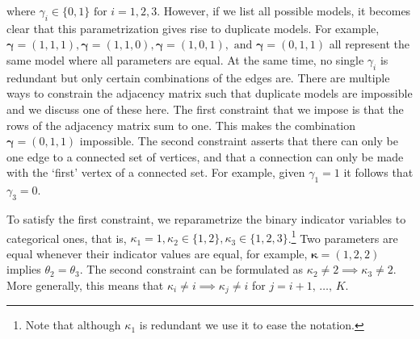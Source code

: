 \documentclass[]{article}
\newcommand{\bindicator}{\gamma}%
\newcommand{\cindicator}{\kappa}%
\begin{document}
where $\bindicator_i \in \{0, 1\} \text{ for } i=1, 2, 3$.
However, if we list all possible models, it becomes clear that this parametrization gives rise to duplicate models.
For example, $\bm{\bindicator} = (1, 1, 1), \bm{\bindicator} = (1, 1, 0), \bm{\bindicator} = (1, 0, 1), \text{ and } \bm{\bindicator} = (0, 1, 1)$ all represent the same model where all parameters are equal.
At the same time, no single $\bindicator_i$ is redundant but only certain combinations of the edges are.
There are multiple ways to constrain the adjacency matrix such that duplicate models are impossible and we discuss one of these here.
The first constraint that we impose is that the rows of the adjacency matrix sum to one.
This makes the combination $\bm{\bindicator} = (0, 1, 1)$ impossible. 
The second constraint asserts that there can only be one edge to a connected set of vertices, and that a connection can only be made with the `first' vertex of a connected set.
For example, given $\bindicator_1 = 1$ it follows that $\bindicator_3 = 0$.

To satisfy the first constraint, we reparametrize the binary indicator variables to categorical ones, that is, $\cindicator_1 = 1, \cindicator_2 \in \{1, 2\}, \cindicator_3 \in \{1, 2, 3\} $.\footnote{Note that although $\cindicator_1$ is redundant we use it to ease the notation.}
Two parameters are equal whenever their indicator values are equal, for example, $\bm{\cindicator} = (1, 2, 2)$ implies $\theta_2 = \theta_3$. 
The second constraint can be formulated as $\cindicator_2 \neq 2 \implies \cindicator_3 \neq 2$. 
More generally, this means that $\cindicator_i \neq i \implies \cindicator_j \neq i $ for $j = i + 1, \,\dots,\,K$.
\end{document}
